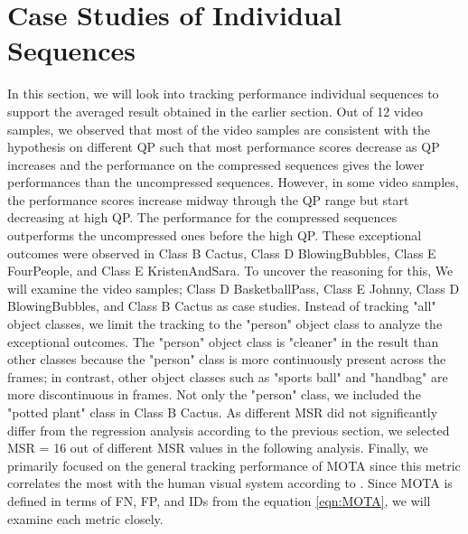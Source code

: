 \section{Case Studies of Individual Sequences}
\label{sec:results/section_b}

In this section, we will look into tracking performance individual sequences to support the averaged result obtained in the earlier section. Out of 12 video samples, we observed that most of the video samples are consistent with the hypothesis on different QP such that most performance scores decrease as QP increases and the performance on the compressed sequences gives the lower performances than the uncompressed sequences. However, in some video samples, the performance scores increase midway through the QP range but start decreasing at high QP. The performance for the compressed sequences outperforms the uncompressed ones before the high QP. These exceptional outcomes were observed in Class B Cactus, Class D BlowingBubbles, Class E FourPeople, and Class E KristenAndSara. To uncover the reasoning for this, We will examine the video samples; Class D BasketballPass, Class E Johnny, Class D BlowingBubbles, and Class B Cactus as case studies. Instead of tracking "all" object classes, we limit the tracking to the "person" object class to analyze the exceptional outcomes. The "person" object class is "cleaner" in the result than other classes because the "person" class is more continuously present across the frames; in contrast, other object classes such as "sports ball" and "handbag" are more discontinuous in frames. Not only the "person" class, we included the "potted plant" class in Class B Cactus. As different MSR did not significantly differ from the regression analysis according to the previous section, we selected MSR = 16 out of different MSR values in the following analysis. Finally, we primarily focused on the general tracking performance of MOTA since this metric correlates the most with the human visual system according to \cite{leal-taixe_motchallenge_2015}. Since MOTA is defined in terms of FN, FP, and IDs from the equation \ref{eqn:MOTA}, we will examine each metric closely.  


